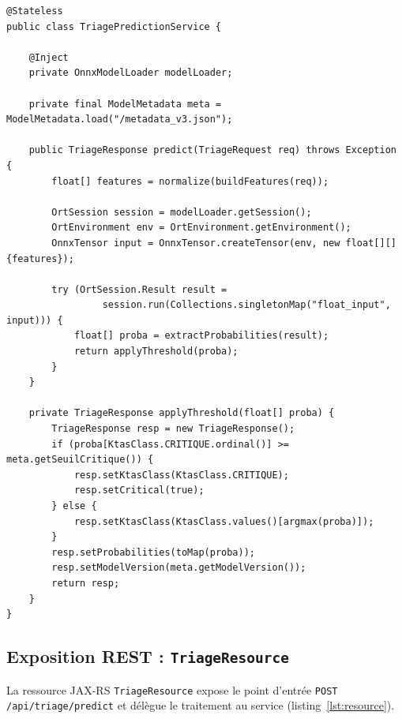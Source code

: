 \begin{listing}[H]
\begin{verbatim}
@Stateless
public class TriagePredictionService {

    @Inject
    private OnnxModelLoader modelLoader;

    private final ModelMetadata meta = ModelMetadata.load("/metadata_v3.json");

    public TriageResponse predict(TriageRequest req) throws Exception {
        float[] features = normalize(buildFeatures(req));

        OrtSession session = modelLoader.getSession();
        OrtEnvironment env = OrtEnvironment.getEnvironment();
        OnnxTensor input = OnnxTensor.createTensor(env, new float[][]{features});

        try (OrtSession.Result result =
                 session.run(Collections.singletonMap("float_input", input))) {
            float[] proba = extractProbabilities(result);
            return applyThreshold(proba);
        }
    }

    private TriageResponse applyThreshold(float[] proba) {
        TriageResponse resp = new TriageResponse();
        if (proba[KtasClass.CRITIQUE.ordinal()] >= meta.getSeuilCritique()) {
            resp.setKtasClass(KtasClass.CRITIQUE);
            resp.setCritical(true);
        } else {
            resp.setKtasClass(KtasClass.values()[argmax(proba)]);
        }
        resp.setProbabilities(toMap(proba));
        resp.setModelVersion(meta.getModelVersion());
        return resp;
    }
}
\end{verbatim}
\caption{Logique métier de prédiction et application du seuil (\texttt{TriagePredictionService}).}
\label{lst:service}
\end{listing}

\subsection{Exposition REST : \texttt{TriageResource}}
La ressource JAX-RS \texttt{TriageResource} expose le point d'entrée \texttt{POST
/api/triage/predict} et délègue le traitement au service (listing~\ref{lst:resource}).

